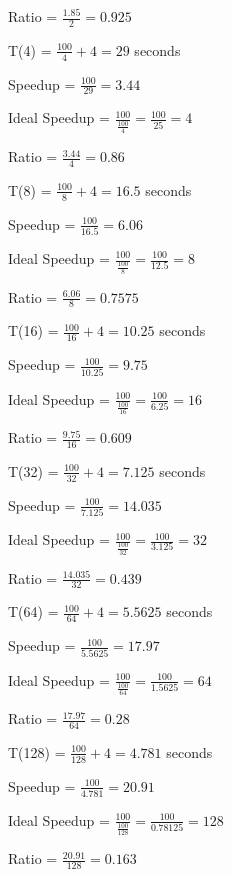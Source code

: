 \documentclass{article}
\begin{document}
    Ratio = $\frac{1.85}{2} = 0.925$
    \vspace*{6pt}

    T(4) = $\frac{100}{4} + 4 = 29$ seconds

    Speedup = $\frac{100}{29} = 3.44$ 

    Ideal Speedup = $\frac{100}{\frac{100}{4}} = \frac{100}{25} = 4$

    Ratio = $\frac{3.44}{4} = 0.86$
    \vspace*{6pt}

    T(8) = $\frac{100}{8} + 4 = 16.5$ seconds

    Speedup = $\frac{100}{16.5} = 6.06$ 

    Ideal Speedup = $\frac{100}{\frac{100}{8}} = \frac{100}{12.5} = 8$

    Ratio = $\frac{6.06}{8} = 0.7575$
    \vspace*{6pt}

    T(16) = $\frac{100}{16} + 4 = 10.25$ seconds

    Speedup = $\frac{100}{10.25} = 9.75$ 

    Ideal Speedup = $\frac{100}{\frac{100}{16}} = \frac{100}{6.25} = 16$

    Ratio = $\frac{9.75}{16} = 0.609$
    \vspace*{6pt}

    T(32) = $\frac{100}{32} + 4 = 7.125$ seconds

    Speedup = $\frac{100}{7.125} = 14.035$ 

    Ideal Speedup = $\frac{100}{\frac{100}{32}} = \frac{100}{3.125} = 32$

    Ratio = $\frac{14.035}{32} = 0.439$
    \vspace*{6pt}

    T(64) = $\frac{100}{64} + 4 = 5.5625$ seconds

    Speedup = $\frac{100}{5.5625} = 17.97$ 

    Ideal Speedup = $\frac{100}{\frac{100}{64}} = \frac{100}{1.5625} = 64$

    Ratio = $\frac{17.97}{64} = 0.28$
    \vspace*{6pt}

    T(128) = $\frac{100}{128} + 4 = 4.781$ seconds

    Speedup = $\frac{100}{4.781} = 20.91$ 

    Ideal Speedup = $\frac{100}{\frac{100}{128}} = \frac{100}{0.78125} = 128$

    Ratio = $\frac{20.91}{128} = 0.163$
    \vspace*{6pt}
\end{document}
